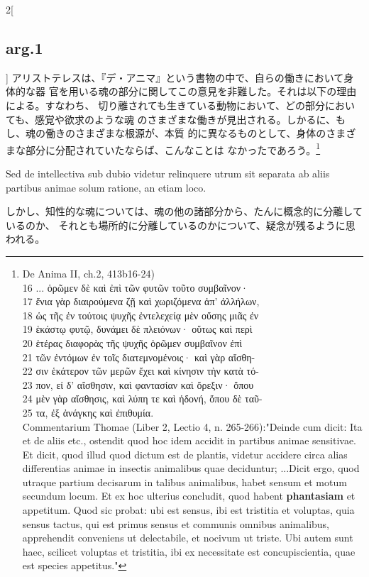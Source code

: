 \documentclass[paper=a4paper,fontsize=10pt,jafontsize=9pt,titlepage]{jlreq}
\begin{document}
\begin{paracol}{2}[\subsection{arg.1}]
 アリストテレスは、『デ・アニマ』という書物の中で、自らの働きにおいて身体的な器
 官を用いる魂の部分に関してこの意見を非難した。それは以下の理由による。すなわち、
 切り離されても生きている動物において、どの部分においても、感覚や欲求のような魂
 のさまざまな働きが見出される。しかるに、もし、魂の働きのさまざまな根源が、本質
 的に異なるものとして、身体のさまざまな部分に分配されていたならば、こんなことは
 なかったであろう。\footnote{De Anima II, ch.2, 413b16-24)\\16 ... ὁρῶμεν δὲ καὶ ἐπὶ τῶν φυτῶν τοῦτο συμβαῖνον·\\17 ἔνια γὰρ διαιρούμενα ζῇ καὶ χωριζόμενα ἀπ’ ἀλλήλων,\\18 ὡς τῆς ἐν τούτοις ψυχῆς ἐντελεχείᾳ μὲν οὔσης μιᾶς ἐν\\19 ἑκάστῳ φυτῷ, δυνάμει δὲ πλειόνων· οὕτως καὶ περὶ\\20 ἑτέρας διαφορὰς τῆς ψυχῆς ὁρῶμεν συμβαῖνον ἐπὶ\\21 τῶν ἐντόμων ἐν τοῖς διατεμνομένοις· καὶ γὰρ αἴσθη-\\22 σιν ἑκάτερον τῶν μερῶν ἔχει καὶ κίνησιν τὴν κατὰ τό-\\23 πον, εἰ δ’ αἴσθησιν, καὶ φαντασίαν καὶ ὄρεξιν· ὅπου\\24 μὲν γὰρ αἴσθησις, καὶ λύπη τε καὶ ἡδονή, ὅπου δὲ ταῦ-\\25 τα, ἐξ ἀνάγκης καὶ ἐπιθυμία. \\Commentarium Thomae (Liber 2, Lectio 4, n. 265-266):"Deinde cum dicit: Ita et de aliis etc., ostendit quod hoc idem accidit in partibus animae sensitivae. Et dicit, quod illud quod dictum est de plantis, videtur accidere circa alias differentias animae in insectis animalibus quae deciduntur; ...Dicit ergo, quod utraque partium decisarum in talibus animalibus, habet sensum et motum secundum locum. Et ex hoc ulterius concludit, quod habent \textbf{phantasiam
   } et appetitum. Quod sic probat: ubi est sensus, ibi est tristitia et voluptas, quia sensus tactus, qui est primus sensus et communis omnibus animalibus, apprehendit conveniens ut delectabile, et nocivum ut triste. Ubi autem sunt haec, scilicet voluptas et tristitia, ibi ex necessitate est concupiscientia, quae est species appetitus."}
 
\switchcolumn*

 Sed de intellectiva sub dubio videtur relinquere utrum sit separata ab aliis
partibus animae solum ratione, an etiam loco.

\switchcolumn

しかし、知性的な魂については、魂の他の諸部分から、たんに概念的に分離しているのか、
それとも場所的に分離しているのかについて、疑念が残るように思われる。
 

\end{paracol}
\end{document}
